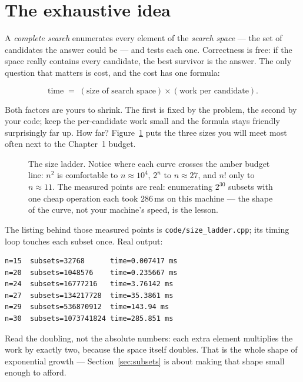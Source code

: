 \section{The exhaustive idea}\label{sec:exhaustive}

A \emph{complete search} enumerates every
element of the \emph{search space} --- the set of
candidates the answer could be --- and tests each one. Correctness is free:
if the space really contains every candidate, the best survivor is the answer.
The only question that matters is cost, and the cost has one formula:

\[
\text{time} \;=\; (\text{size of search space}) \times (\text{work per candidate}).
\]

Both factors are yours to shrink. The first is fixed by the problem, the
second by your code; keep the per-candidate work small and the formula stays
friendly surprisingly far up. How far? Figure~\ref{fig:ladder} puts the three
sizes you will meet most often next to the Chapter~1 budget.

\begin{figure}[ht]\centering

\caption{The size ladder. Notice where each curve crosses the amber budget
line: $n^2$ is comfortable to $n \approx 10^4$, $2^n$ to $n \approx 27$, and
$n!$ only to $n \approx 11$. The measured points are real: enumerating $2^{30}$
subsets with one cheap operation each took $286$\,ms on this machine --- the
shape of the curve, not your machine's speed, is the lesson.}
\label{fig:ladder}
\end{figure}

The listing behind those measured points is \texttt{code/size\_ladder.cpp};
its timing loop touches each subset once. Real output:

\begin{lstlisting}[numbers=none]
n=15  subsets=32768      time=0.007417 ms
n=20  subsets=1048576    time=0.235667 ms
n=24  subsets=16777216   time=3.76142 ms
n=27  subsets=134217728  time=35.3861 ms
n=29  subsets=536870912  time=143.94 ms
n=30  subsets=1073741824 time=285.851 ms
\end{lstlisting}

Read the doubling, not the absolute numbers: each extra element multiplies
the work by exactly two, because the space itself doubles. That is the whole
shape of exponential growth --- Section~\ref{sec:subsets} is about making
that shape small enough to afford.

